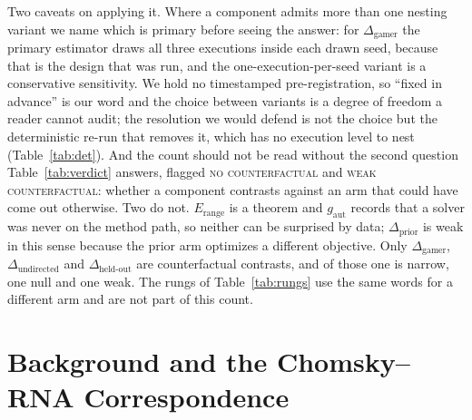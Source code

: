 \documentclass[11pt]{article}
\begin{document}
Two caveats on applying it. Where a component admits more than one nesting variant we name which is primary
before seeing the answer: for $\Delta_{\mathrm{gamer}}$ the primary estimator draws all
three executions inside each drawn seed, because that is the design that was run, and the
one-execution-per-seed variant is a conservative sensitivity. We hold no timestamped pre-registration, so
``fixed in advance'' is our word and the choice between variants is a degree of freedom a reader cannot audit;
the resolution we would defend is not the choice but the deterministic re-run that removes it, which has no
execution level to nest (Table~\ref{tab:det}). And the count should not be read without the second question
Table~\ref{tab:verdict} answers, flagged \textsc{no counterfactual} and \textsc{weak counterfactual}: whether a
component contrasts against an arm that could have come out otherwise. Two do not. $E_{\mathrm{range}}$ is a
theorem and $g_{\mathrm{aut}}$ records that a solver was never on the method path, so neither can be surprised
by data; $\Delta_{\mathrm{prior}}$ is weak in this sense because the prior arm optimizes a different objective.
Only $\Delta_{\mathrm{gamer}}$, $\Delta_{\mathrm{undirected}}$ and $\Delta_{\mathrm{held\text{-}out}}$ are
counterfactual contrasts, and of those one is narrow, one null and one weak. The rungs of
Table~\ref{tab:rungs} use the same words for a different arm and are not part of this count.

\section{Background and the Chomsky--RNA Correspondence}\label{sec:bg}
\end{document}
